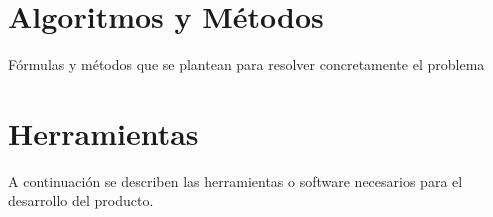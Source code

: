 \documentclass[12pt,a4paper,spanish]{article}
\begin{document}
\section{Algoritmos y Métodos}
	Fórmulas y métodos que se plantean para resolver concretamente el problema


\section{Herramientas} 
	A continuación se describen las herramientas o software necesarios para el desarrollo del producto.
\end{document}
